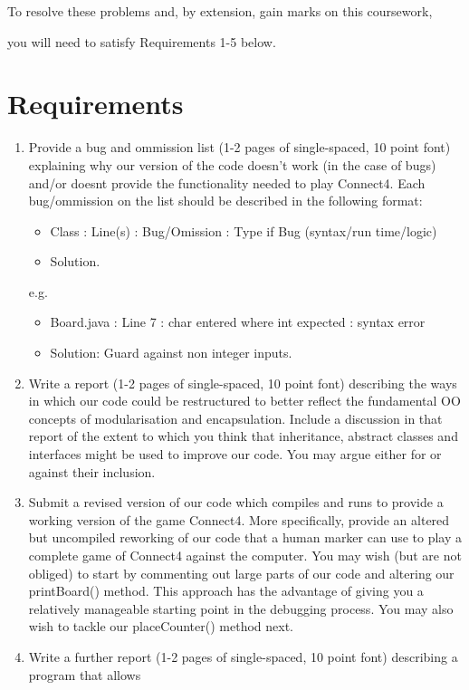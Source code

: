 \documentclass[12pt, oneside]{article}   	%
\begin{document}
To resolve these problems and, by extension, gain marks on this coursework, 

you will need to satisfy Requirements 1-5 below. 

\section{Requirements}
\begin{enumerate}
\item Provide a bug and ommission list (1-2 pages of single-spaced, 10 point font) explaining why our version of the code doesn't work (in the case of bugs) and/or doesnt provide the functionality needed to play Connect4. Each bug/ommission on the list should be described in the following format:
\begin{itemize}
\item Class : Line(s) : Bug/Omission : Type if Bug (syntax/run time/logic)
\item Solution.
\end{itemize}
e.g.
\begin{itemize}
\item Board.java : Line 7 : char entered where int expected : syntax error
\item Solution: Guard against non integer inputs.
\end{itemize}
\item Write a report (1-2 pages of single-spaced, 10 point font) describing the ways in which our code could be restructured to 
better reflect the fundamental OO concepts of modularisation and encapsulation. Include a discussion 
in that report of the extent to which you think that inheritance, abstract classes and interfaces 
might be used to improve our code. You may argue either for or against their inclusion.
\item Submit a revised version of our code which compiles and runs to provide a working 
version of the game Connect4. More specifically, provide an altered but 
uncompiled reworking of our code that a human marker can use to play a complete game of 
Connect4 against the computer. 
You may wish (but are not obliged) to start by commenting out large parts of our code and altering our printBoard() method. This approach has the advantage of giving you a relatively manageable starting point in the debugging process. You may also wish to tackle our placeCounter() method next.
\item Write a further report (1-2 pages of single-spaced, 10 point font) describing a program that allows

\end{enumerate}
\end{document}
